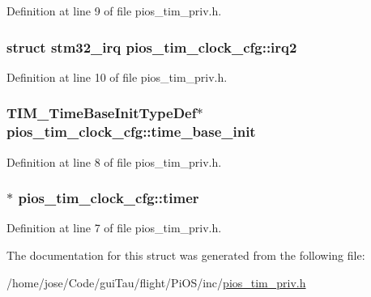 Definition at line 9 of file pios\-\_\-tim\-\_\-priv.\-h.

\hypertarget{structpios__tim__clock__cfg_acb3841e388653b5ab1b67bfcc2418b33}{
\subsubsection[{irq2}]{\setlength{\rightskip}{0pt plus 5cm}struct {\bf stm32\-\_\-irq} pios\-\_\-tim\-\_\-clock\-\_\-cfg\-::irq2}}\label{structpios__tim__clock__cfg_acb3841e388653b5ab1b67bfcc2418b33}


Definition at line 10 of file pios\-\_\-tim\-\_\-priv.\-h.

\hypertarget{structpios__tim__clock__cfg_abdc708ba1a22f20e3f31502ca32b2c13}{
\subsubsection[{time\-\_\-base\-\_\-init}]{ T\-I\-M\-\_\-\-Time\-Base\-Init\-Type\-Def$\ast$ pios\-\_\-tim\-\_\-clock\-\_\-cfg\-::time\-\_\-base\-\_\-init}}\label{structpios__tim__clock__cfg_abdc708ba1a22f20e3f31502ca32b2c13}


Definition at line 8 of file pios\-\_\-tim\-\_\-priv.\-h.

\hypertarget{structpios__tim__clock__cfg_a537f6f4946bc2f5e188a9c3fec55647e}{
\subsubsection[{timer}]{$\ast$ pios\-\_\-tim\-\_\-clock\-\_\-cfg\-::timer}}\label{structpios__tim__clock__cfg_a537f6f4946bc2f5e188a9c3fec55647e}


Definition at line 7 of file pios\-\_\-tim\-\_\-priv.\-h.



The documentation for this struct was generated from the following file\-:\begin{DoxyCompactItemize}
\item 
/home/jose/\-Code/gui\-Tau/flight/\-Pi\-O\-S/inc/\hyperlink{pios__tim__priv_8h}{pios\-\_\-tim\-\_\-priv.\-h}\end{DoxyCompactItemize}
